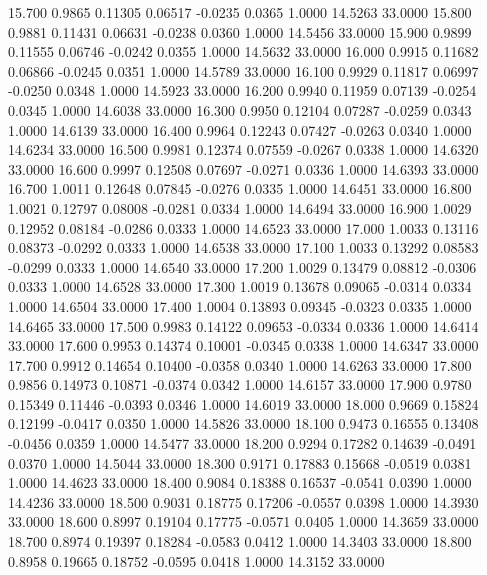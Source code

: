   15.700   0.9865   0.11305   0.06517  -0.0235   0.0365   1.0000  14.5263  33.0000
  15.800   0.9881   0.11431   0.06631  -0.0238   0.0360   1.0000  14.5456  33.0000
  15.900   0.9899   0.11555   0.06746  -0.0242   0.0355   1.0000  14.5632  33.0000
  16.000   0.9915   0.11682   0.06866  -0.0245   0.0351   1.0000  14.5789  33.0000
  16.100   0.9929   0.11817   0.06997  -0.0250   0.0348   1.0000  14.5923  33.0000
  16.200   0.9940   0.11959   0.07139  -0.0254   0.0345   1.0000  14.6038  33.0000
  16.300   0.9950   0.12104   0.07287  -0.0259   0.0343   1.0000  14.6139  33.0000
  16.400   0.9964   0.12243   0.07427  -0.0263   0.0340   1.0000  14.6234  33.0000
  16.500   0.9981   0.12374   0.07559  -0.0267   0.0338   1.0000  14.6320  33.0000
  16.600   0.9997   0.12508   0.07697  -0.0271   0.0336   1.0000  14.6393  33.0000
  16.700   1.0011   0.12648   0.07845  -0.0276   0.0335   1.0000  14.6451  33.0000
  16.800   1.0021   0.12797   0.08008  -0.0281   0.0334   1.0000  14.6494  33.0000
  16.900   1.0029   0.12952   0.08184  -0.0286   0.0333   1.0000  14.6523  33.0000
  17.000   1.0033   0.13116   0.08373  -0.0292   0.0333   1.0000  14.6538  33.0000
  17.100   1.0033   0.13292   0.08583  -0.0299   0.0333   1.0000  14.6540  33.0000
  17.200   1.0029   0.13479   0.08812  -0.0306   0.0333   1.0000  14.6528  33.0000
  17.300   1.0019   0.13678   0.09065  -0.0314   0.0334   1.0000  14.6504  33.0000
  17.400   1.0004   0.13893   0.09345  -0.0323   0.0335   1.0000  14.6465  33.0000
  17.500   0.9983   0.14122   0.09653  -0.0334   0.0336   1.0000  14.6414  33.0000
  17.600   0.9953   0.14374   0.10001  -0.0345   0.0338   1.0000  14.6347  33.0000
  17.700   0.9912   0.14654   0.10400  -0.0358   0.0340   1.0000  14.6263  33.0000
  17.800   0.9856   0.14973   0.10871  -0.0374   0.0342   1.0000  14.6157  33.0000
  17.900   0.9780   0.15349   0.11446  -0.0393   0.0346   1.0000  14.6019  33.0000
  18.000   0.9669   0.15824   0.12199  -0.0417   0.0350   1.0000  14.5826  33.0000
  18.100   0.9473   0.16555   0.13408  -0.0456   0.0359   1.0000  14.5477  33.0000
  18.200   0.9294   0.17282   0.14639  -0.0491   0.0370   1.0000  14.5044  33.0000
  18.300   0.9171   0.17883   0.15668  -0.0519   0.0381   1.0000  14.4623  33.0000
  18.400   0.9084   0.18388   0.16537  -0.0541   0.0390   1.0000  14.4236  33.0000
  18.500   0.9031   0.18775   0.17206  -0.0557   0.0398   1.0000  14.3930  33.0000
  18.600   0.8997   0.19104   0.17775  -0.0571   0.0405   1.0000  14.3659  33.0000
  18.700   0.8974   0.19397   0.18284  -0.0583   0.0412   1.0000  14.3403  33.0000
  18.800   0.8958   0.19665   0.18752  -0.0595   0.0418   1.0000  14.3152  33.0000
